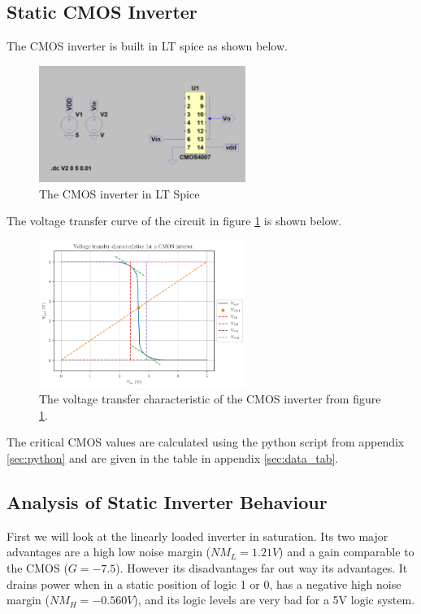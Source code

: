 \documentclass[titlepage, 12pt]{article}
\begin{document}
    \subsection{Static CMOS Inverter}
    The CMOS inverter is built in LT spice as shown below.
    \begin{figure}[H]
        \centering
        \includegraphics[width=0.6\textwidth]{figures/part_2b_circ.png}
        \caption{The CMOS inverter in LT Spice}
        \label{fig:2b_circ}
    \end{figure}
    The voltage transfer curve of the circuit in figure
    \ref{fig:2b_circ} is shown below.
    \begin{figure}[H]
        \centering
        \includegraphics[width=0.6\textwidth]{figures/part_2b.png}
        \caption{The voltage transfer characteristic of the CMOS
        inverter from figure \ref{fig:2b_circ}.}
    \end{figure}
    The critical CMOS values are calculated using the python script from
    appendix \ref{sec:python} and are given in the table in appendix
    \ref{sec:data_tab}.

    \subsection{Analysis of Static Inverter Behaviour}
    First we will look at the linearly loaded inverter in saturation.
    Its two major advantages are a high low noise margin ($NM_L =
    1.21V$) and a gain comparable to the CMOS ($G=-7.5$). However its
    disadvantages far out way its advantages. It drains power when in a
    static position of logic 1 or 0, has a negative high noise margin
    ($NM_H = -0.560V$), and its logic levels are very bad for a 5V
    logic system.
\end{document}

